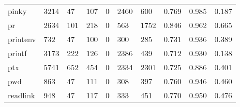 \begin{longtable}{lp{2.0cm}p{2.0cm}p{2.0cm}p{2.0cm}p{2.0cm}p{2.0cm}p{2.0cm}p{2.0cm}p{2.0cm}}
pinky     &                   3214 &                                 47 &                               107 &                                0 &                              2460 &                             600 &                                0.769 &                                  0.985 &                                0.187 \\
pr        &                   2634 &                                101 &                               218 &                                0 &                               563 &                            1752 &                                0.846 &                                  0.962 &                                0.665 \\
printenv  &                    732 &                                 47 &                               100 &                                0 &                               300 &                             285 &                                0.731 &                                  0.936 &                                0.389 \\
printf    &                   3173 &                                222 &                               126 &                                0 &                              2386 &                             439 &                                0.712 &                                  0.930 &                                0.138 \\
ptx       &                   5741 &                                652 &                               454 &                                0 &                              2334 &                            2301 &                                0.725 &                                  0.886 &                                0.401 \\
pwd       &                    863 &                                 47 &                               111 &                                0 &                               308 &                             397 &                                0.760 &                                  0.946 &                                0.460 \\
readlink  &                    948 &                                 47 &                               117 &                                0 &                               333 &                             451 &                                0.770 &                                  0.950 &                                0.476 \\

\end{longtable}
